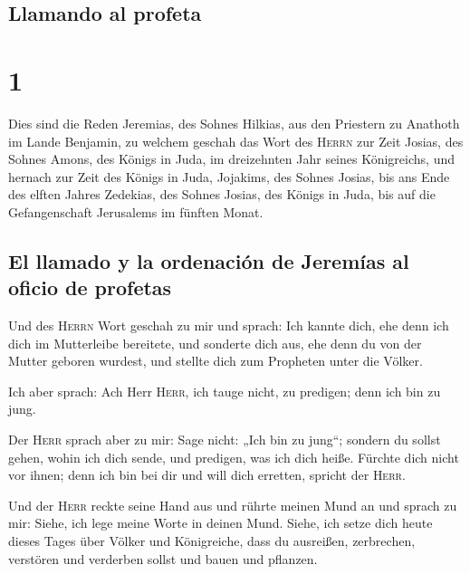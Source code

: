 \hypertarget{llamando-al-profeta}{%
\subsection{Llamando al profeta}\label{llamando-al-profeta}}

\hypertarget{section}{%
\section{1}\label{section}}

 Dies sind die Reden Jeremias, des Sohnes Hilkias, aus den
Priestern zu Anathoth im Lande Benjamin,  zu welchem
geschah das Wort des \textsc{Herrn} zur Zeit Josias, des Sohnes Amons,
des Königs in Juda, im dreizehnten Jahr seines Königreichs,
 und hernach zur Zeit des Königs in Juda, Jojakims, des
Sohnes Josias, bis ans Ende des elften Jahres Zedekias, des Sohnes
Josias, des Königs in Juda, bis auf die Gefangenschaft Jerusalems im
fünften Monat.

\hypertarget{el-llamado-y-la-ordenaciuxf3n-de-jeremuxedas-al-oficio-de-profetas}{%
\subsection{El llamado y la ordenación de Jeremías al oficio de
profetas}\label{el-llamado-y-la-ordenaciuxf3n-de-jeremuxedas-al-oficio-de-profetas}}

 Und des \textsc{Herrn} Wort geschah zu mir und sprach:
 Ich kannte dich, ehe denn ich dich im Mutterleibe
bereitete, und sonderte dich aus, ehe denn du von der Mutter geboren
wurdest, und stellte dich zum Propheten unter die Völker.

 Ich aber sprach: Ach Herr \textsc{Herr}, ich tauge nicht,
zu predigen; denn ich bin zu jung.

 Der \textsc{Herr} sprach aber zu mir: Sage nicht: „Ich
bin zu jung``; sondern du sollst gehen, wohin ich dich sende, und
predigen, was ich dich heiße.  Fürchte dich nicht vor
ihnen; denn ich bin bei dir und will dich erretten, spricht der
\textsc{Herr}.

 Und der \textsc{Herr} reckte seine Hand aus und rührte
meinen Mund an und sprach zu mir: Siehe, ich lege meine Worte in deinen
Mund.  Siehe, ich setze dich heute dieses Tages über
Völker und Königreiche, dass du ausreißen, zerbrechen, verstören und
verderben sollst und bauen und pflanzen.

